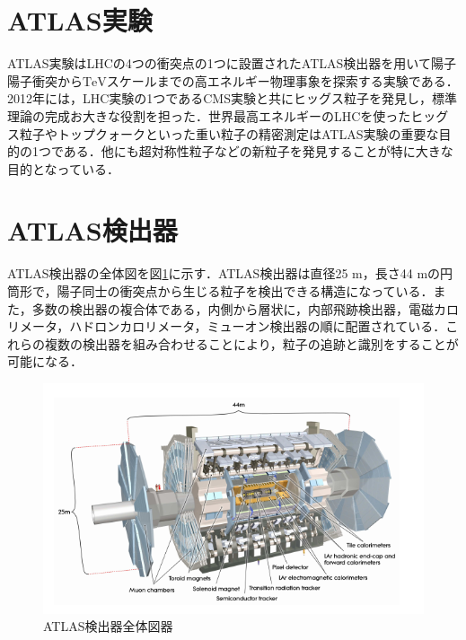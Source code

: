 \section{ATLAS実験}
\label{sec:ATLAS-ex}
ATLAS実験はLHCの4つの衝突点の1つに設置されたATLAS検出器を用いて陽子陽子衝突から$\mathrm{TeV}$スケールまでの高エネルギー物理事象を探索する実験である．2012年には，LHC実験の1つであるCMS実験と共にヒッグス粒子を発見し，標準理論の完成お大きな役割を担った．世界最高エネルギーのLHCを使ったヒッグス粒子やトップクォークといった重い粒子の精密測定はATLAS実験の重要な目的の1つである．他にも超対称性粒子などの新粒子を発見することが特に大きな目的となっている．\par

\section{ATLAS検出器}
\label{sec:ATLAS}
ATLAS検出器の全体図を図\ref{fig:ATLAS}に示す．ATLAS検出器は直径25 $\mathrm{m}$，長さ44 $\mathrm{m}$の円筒形で，陽子同士の衝突点から生じる粒子を検出できる構造になっている．また，多数の検出器の複合体である，内側から層状に，内部飛跡検出器，電磁カロリメータ，ハドロンカロリメータ，ミューオン検出器の順に配置されている．これらの複数の検出器を組み合わせることにより，粒子の追跡と識別をすることが可能になる．\par
\begin{figure}
\centering
\includegraphics[width=12cm]{./figure/ATLAS.png}
\caption{ATLAS検出器全体図器\cite{Collaboration_2008}}
\label{fig:ATLAS}
\end{figure}

